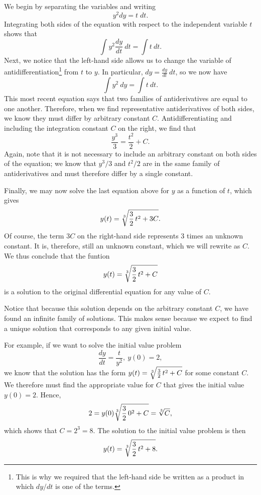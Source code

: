 \begin{solution}
We begin by separating the variables and writing
    $$
    y^2 dy  = t\; dt.
    $$
Integrating both sides of the equation with respect to the independent
    variable $t$ shows that
    $$
    \int y^2\frac{dy}{dt}~dt = \int t~dt.
    $$
Next, we notice that the left-hand side allows us to change
    the variable of antidifferentiation\footnote{This is why we required that the left-hand side be written as a
    product in which $dy/dt$ is one of the terms.} from $t$ to $y$.  In
    particular,
    $dy = \frac{dy}{dt}~dt$, so we now have
    $$
    \int y^2 ~dy = \int t~dt.
    $$
   This most recent equation says that two families of antiderivatives are
    equal to one another.  Therefore, when we find representative
    antiderivatives of both sides, we know they must differ by
    arbitrary constant $C$.  Antidifferentiating and including the integration constant $C$ on the right, we find that
    $$
    \frac{y^3}{3} = \frac{t^2}{2} + C.
    $$
    Again, note that it is not necessary to include an arbitrary constant on both sides 
    of the equation;  we know that $y^3/3$ and $t^2/2$ are in the same
    family of antiderivatives and must therefore differ by a single
    constant.

Finally, we may now solve the last equation above for $y$ as a function of $t$, which gives
    $$
    y(t) = \sqrt[3]{\frac 32 \thinspace t^2 + 3C}.
    $$
    Of course, the term $3C$ on the right-hand side represents
    3 times an unknown constant.  It is, therefore, still an unknown
    constant, which we will rewrite as $C$.  We thus conclude that the funtion
    $$
    y(t) = \sqrt[3]{\frac 32 \thinspace t^2 + C}
    $$
is a solution to the original differential equation for any value of $C$.
\end{solution}



Notice that because this solution depends on the arbitrary constant $C$, we have found an infinite family of
solutions.  This makes sense because we expect to find a unique solution that corresponds to any given
 initial value.

For example, if we want to solve the initial value problem
$$
  \frac{dy}{dt} = \frac{t}{y^2}, \
  y(0) = 2,
$$
we know that the solution has the form $y(t) = \sqrt[3]{\frac32\thinspace
  t^2 + C}$ for some constant $C$.  We therefore must find the appropriate
value for $C$ that gives the initial value $y(0)=2$.  Hence,
$$
  2 = y(0)  \sqrt[3]{\frac 32 \thinspace 0^2 + C} = \sqrt[3]{C},
  $$
which shows that $C = 2^3 = 8$.  The solution to the initial value problem is then
$$
y(t) = \sqrt[3]{\frac32\thinspace t^2+8}.
$$





